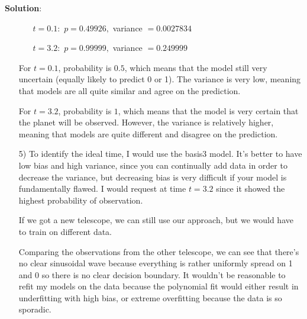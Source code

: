 \documentclass[submit]{../harvardml}
\newenvironment{solution}{
    \vspace{2mm}
    \color{blue}\noindent\textbf{Solution}:
}{}
\begin{document}
\begin{solution}
\begin{itemize}
    \begin{itemize}
      \item[$t=0.1:$] $p = 0.49926,$ variance $= 0.0027834$
      \item[$t=3.2:$] $p = 0.99999,$ variance $= 0.249999$
      \item[] 
    \end{itemize}
    For $t=0.1$, probability is $0.5$, which means that the model still very uncertain (equally likely to predict 0 or 1). The variance is very low, meaning that models are all quite similar and agree on the prediction. \par
    For $t=3.2$, probability is $1$, which means that the model is very certain that the planet will be observed. However, the variance is relatively higher, meaning that models are quite different and disagree on the prediction.\par
    \item[5)] To identify the ideal time, I would use the basis3 model. It's better to have low bias and high variance, since you can continually add data in order to decrease the variance, but decreasing bias is very difficult if your model is fundamentally flawed. I would request at time $t=3.2$ since it showed the highest probability of observation. \par
    If we got a new telescope, we can still use our approach, but we would have to train on different data.\par
    Comparing the observations from the other telescope, we can see that there's no clear sinusoidal wave because everything is rather uniformly spread on 1 and 0 so there is no clear decision boundary. It wouldn't be reasonable to refit my models on the data because the polynomial fit would either result in underfitting with high bias, or extreme overfitting because the data is so sporadic. 
  \end{itemize}
\end{solution}

\end{document}
